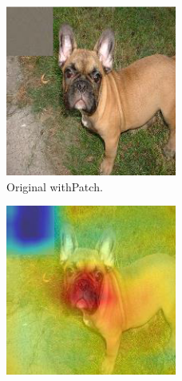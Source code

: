 \documentclass[sigconf]{acmart}
\begin{document}
\begin{figure}[ht]
\begin{subfigure}{0.32\linewidth}
      \includegraphics[width=\linewidth]{figures/patch_plus_dog.png}
      \caption{\scriptsize{Original with\newline Patch.}}
      \label{fig:patch_plus_dog}
    \end{subfigure}
    \begin{subfigure}{0.32\linewidth}
      \includegraphics[width=\linewidth]{figures/patch_fooled.png}

\end{subfigure}
\end{figure}
\end{document}
